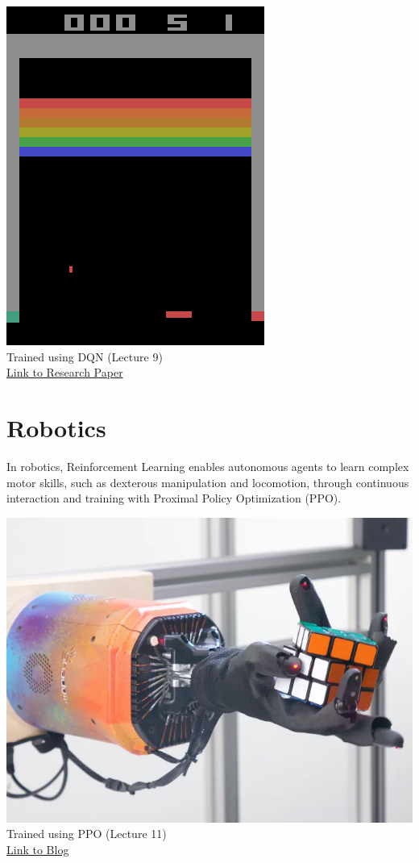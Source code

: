 \documentclass[
  letterpaper,
  DIV=11,
  numbers=noendperiod]{scrreprt}
\begin{document}
\includegraphics[width=\linewidth,height=0.7\textheight,keepaspectratio]{lecture1/images/breakout.gif}\\
Trained using DQN (Lecture 9)\\
\href{https://arxiv.org/pdf/1312.5602}{Link to Research Paper}

\section{Robotics}\label{robotics}

In robotics, Reinforcement Learning enables autonomous agents to learn
complex motor skills, such as dexterous manipulation and locomotion,
through continuous interaction and training with Proximal Policy
Optimization (PPO).

\includegraphics[width=0.55\linewidth,height=\textheight,keepaspectratio]{lecture1/images/openaidactyl.png}\\
Trained using PPO (Lecture 11)\\
\href{https://openai.com/index/solving-rubiks-cube/}{Link to Blog}
\end{document}
